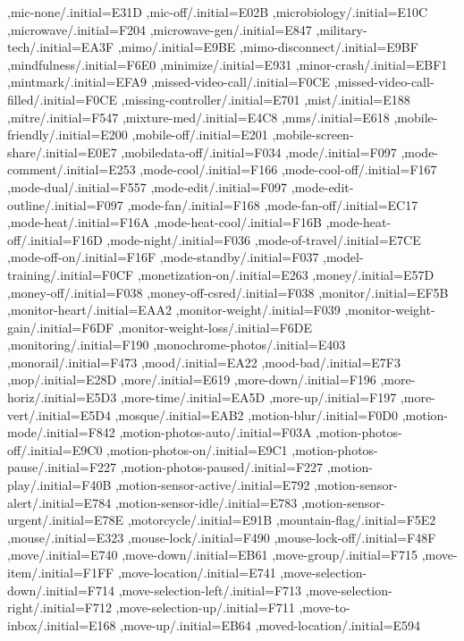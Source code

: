{ ,mic-none/.initial=E31D
 ,mic-off/.initial=E02B
 ,microbiology/.initial=E10C
 ,microwave/.initial=F204
 ,microwave-gen/.initial=E847
 ,military-tech/.initial=EA3F
 ,mimo/.initial=E9BE
 ,mimo-disconnect/.initial=E9BF
 ,mindfulness/.initial=F6E0
 ,minimize/.initial=E931
 ,minor-crash/.initial=EBF1
 ,mintmark/.initial=EFA9
 ,missed-video-call/.initial=F0CE
 ,missed-video-call-filled/.initial=F0CE
 ,missing-controller/.initial=E701
 ,mist/.initial=E188
 ,mitre/.initial=F547
 ,mixture-med/.initial=E4C8
 ,mms/.initial=E618
 ,mobile-friendly/.initial=E200
 ,mobile-off/.initial=E201
 ,mobile-screen-share/.initial=E0E7
 ,mobiledata-off/.initial=F034
 ,mode/.initial=F097
 ,mode-comment/.initial=E253
 ,mode-cool/.initial=F166
 ,mode-cool-off/.initial=F167
 ,mode-dual/.initial=F557
 ,mode-edit/.initial=F097
 ,mode-edit-outline/.initial=F097
 ,mode-fan/.initial=F168
 ,mode-fan-off/.initial=EC17
 ,mode-heat/.initial=F16A
 ,mode-heat-cool/.initial=F16B
 ,mode-heat-off/.initial=F16D
 ,mode-night/.initial=F036
 ,mode-of-travel/.initial=E7CE
 ,mode-off-on/.initial=F16F
 ,mode-standby/.initial=F037
 ,model-training/.initial=F0CF
 ,monetization-on/.initial=E263
 ,money/.initial=E57D
 ,money-off/.initial=F038
 ,money-off-csred/.initial=F038
 ,monitor/.initial=EF5B
 ,monitor-heart/.initial=EAA2
 ,monitor-weight/.initial=F039
 ,monitor-weight-gain/.initial=F6DF
 ,monitor-weight-loss/.initial=F6DE
 ,monitoring/.initial=F190
 ,monochrome-photos/.initial=E403
 ,monorail/.initial=F473
 ,mood/.initial=EA22
 ,mood-bad/.initial=E7F3
 ,mop/.initial=E28D
 ,more/.initial=E619
 ,more-down/.initial=F196
 ,more-horiz/.initial=E5D3
 ,more-time/.initial=EA5D
 ,more-up/.initial=F197
 ,more-vert/.initial=E5D4
 ,mosque/.initial=EAB2
 ,motion-blur/.initial=F0D0
 ,motion-mode/.initial=F842
 ,motion-photos-auto/.initial=F03A
 ,motion-photos-off/.initial=E9C0
 ,motion-photos-on/.initial=E9C1
 ,motion-photos-pause/.initial=F227
 ,motion-photos-paused/.initial=F227
 ,motion-play/.initial=F40B
 ,motion-sensor-active/.initial=E792
 ,motion-sensor-alert/.initial=E784
 ,motion-sensor-idle/.initial=E783
 ,motion-sensor-urgent/.initial=E78E
 ,motorcycle/.initial=E91B
 ,mountain-flag/.initial=F5E2
 ,mouse/.initial=E323
 ,mouse-lock/.initial=F490
 ,mouse-lock-off/.initial=F48F
 ,move/.initial=E740
 ,move-down/.initial=EB61
 ,move-group/.initial=F715
 ,move-item/.initial=F1FF
 ,move-location/.initial=E741
 ,move-selection-down/.initial=F714
 ,move-selection-left/.initial=F713
 ,move-selection-right/.initial=F712
 ,move-selection-up/.initial=F711
 ,move-to-inbox/.initial=E168
 ,move-up/.initial=EB64
 ,moved-location/.initial=E594
}
